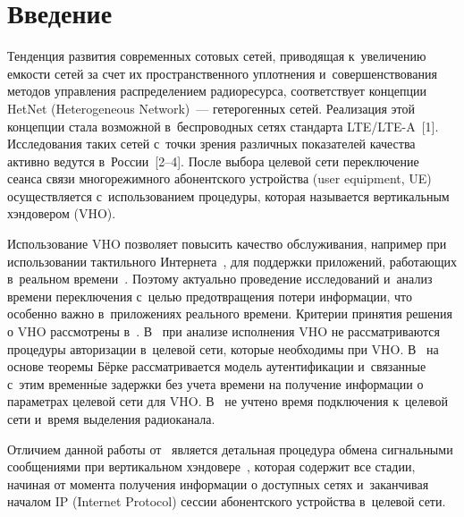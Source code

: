 



\thispagestyle{headings}

\begin{multicols}{2}

\label{st\stat}

\section{Введение}

\vspace*{-2pt}

  Тенденция развития современных сотовых сетей, приводящая к~увеличению 
емкости сетей за счет их пространственного уплотнения и~совершенствования 
методов управления распределением радиоресурса, соответствует концепции 
HetNet (Heterogeneous Network)~--- гетерогенных сетей. Реализация этой 
концепции стала возможной в~беспроводных сетях стандарта LTE/LTE-A~[1]. 
Исследования таких сетей с~точки зрения различных показателей качества 
активно ведутся в~России~[2--4]. После выбора целевой сети переключение 
сеанса связи многорежимного абонентского устройства (user equipment, UE) 
осуществляется с~использованием процедуры, которая называется 
вертикальным хэндовером (VHO). 

Использование VHO 
позволяет повысить качество обслуживания, например при использовании 
тактильного Интернета~\cite{5-gre}, для поддержки приложений, работающих 
в~реальном времени~\cite{6-gre}. Поэтому актуально проведение исследований и~анализ времени переключения с~целью предотвращения потери информации, 
что особенно важно в~приложениях реального времени. Критерии принятия 
решения о VHO рассмотрены в~\cite{7-gre}. В~\cite{8-gre} при анализе 
исполнения VHO не рассматриваются процедуры авторизации в~целевой сети, 
которые необходимы при VHO. В~\cite{9-gre} на основе теоремы Бёрке 
рассматривается модель аутентификации и~связанные с~этим временн$\acute{\mbox{ы}}$е 
задержки без учета времени на получение информации о параметрах целевой 
сети для VHO. В~\cite{10-gre, 11-gre} не учтено время подключения к~целевой 
сети и~время выделения радиоканала. 

Отличием данной работы  
от~\cite{7-gre, 8-gre, 9-gre, 10-gre, 11-gre} является детальная процедура обмена 
сигнальными сообщениями при вертикальном хэндовере~\cite{12-gre}, которая 
содержит все стадии, начиная от момента получения информации о доступных 
сетях и~заканчивая началом IP (Internet Protocol) сес\-сии абонентского устройства в~целевой 
сети. 


\end{multicols}
